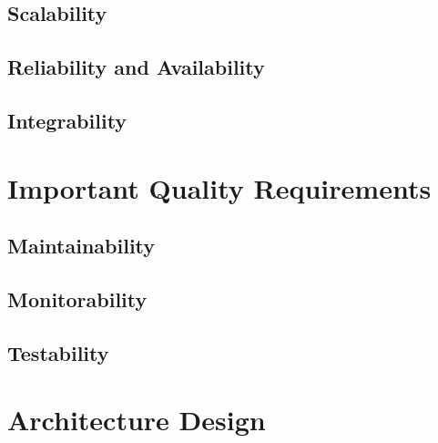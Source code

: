 \documentclass[a4paper,12pt,titlepage]{article}
\begin{document}
\subsection{Scalability}
	
	
\subsection{Reliability and Availability}
	
	
\subsection{Integrability}
	



\newpage
\section{Important Quality Requirements}
			
\subsection{Maintainability}
	
	
\subsection{Monitorability}
	
	
\subsection{Testability}
	
	
	


\newpage
\section{Architecture Design}
\end{document}

